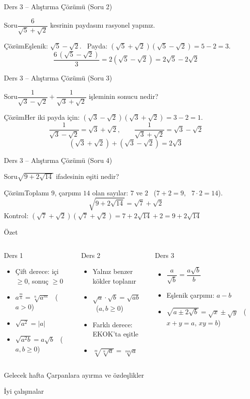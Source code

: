 \documentclass[aspectratio=169,11pt]{beamer}
\newcommand{\soru}[3]{%
\begin{frame}{#1}
  \begin{block}{Soru}\large #2\end{block}
  \pause
  \begin{exampleblock}{Çözüm}\large #3\end{exampleblock}
\end{frame}}
\begin{document}
\soru{Ders 3 -- Alıştırma Çözümü (Soru 2)}
{\(\dfrac{6}{\sqrt5+\sqrt2}\) kesrinin paydasını rasyonel yapınız.}
{Eşlenik: \(\sqrt5-\sqrt2\). \ Payda: \((\sqrt5+\sqrt2)(\sqrt5-\sqrt2)=5-2=3\).
\[\frac{6\,(\sqrt5-\sqrt2)}{3}=2(\sqrt5-\sqrt2)=2\sqrt5-2\sqrt2\]}

\soru{Ders 3 -- Alıştırma Çözümü (Soru 3)}
{\(\dfrac{1}{\sqrt3-\sqrt2}+\dfrac{1}{\sqrt3+\sqrt2}\) işleminin sonucu nedir?}
{Her iki payda için: \((\sqrt3-\sqrt2)(\sqrt3+\sqrt2)=3-2=1\).
\[\frac{1}{\sqrt3-\sqrt2}=\sqrt3+\sqrt2,\qquad \frac{1}{\sqrt3+\sqrt2}=\sqrt3-\sqrt2\]
\[(\sqrt3+\sqrt2)+(\sqrt3-\sqrt2)=2\sqrt3\]}

\soru{Ders 3 -- Alıştırma Çözümü (Soru 4)}
{\(\sqrt{9+2\sqrt{14}}\) ifadesinin eşiti nedir?}
{Toplamı \(9\), çarpımı \(14\) olan sayılar: \(7\) ve \(2\) \ (\(7+2=9\), \ \(7\cdot 2=14\)).
\[\sqrt{9+2\sqrt{14}}=\sqrt7+\sqrt2\]
Kontrol: \((\sqrt7+\sqrt2)(\sqrt7+\sqrt2)=7+2\sqrt{14}+2=9+2\sqrt{14}\) \checkmark}


\begin{frame}{Özet}
\begin{columns}[t]
\begin{block}{Ders 1}
\begin{itemize}
\item Çift derece: içi \(\ge 0\), sonuç \(\ge 0\)
\item \(a^{\frac mn}=\sqrt[n]{a^m}\) \ (\(a>0\))
\item \(\sqrt{a^2}=|a|\)
\item \(\sqrt{a^2b}=a\sqrt b\) \ (\(a,b\ge 0\))
\end{itemize}
\end{block}
\begin{block}{Ders 2}
\begin{itemize}
\item Yalnız benzer kökler toplanır
\item \(\sqrt a\cdot\sqrt b=\sqrt{ab}\) \ (\(a,b\ge 0\))
\item Farklı derece: EKOK'ta eşitle
\item \(\sqrt[m]{\sqrt[n]{a}}=\sqrt[mn]{a}\)
\end{itemize}
\end{block}
\begin{block}{Ders 3}
\begin{itemize}
\item \(\dfrac{a}{\sqrt b}=\dfrac{a\sqrt b}{b}\)
\item Eşlenik çarpımı: \(a-b\)
\item \(\sqrt{a\pm 2\sqrt b}=\sqrt x\pm\sqrt y\) \ (\(x+y=a\), \(xy=b\))
\end{itemize}
\end{block}
\end{columns}
\vspace{6pt}
\begin{alertblock}{Gelecek hafta}
Çarpanlara ayırma ve özdeşlikler
\end{alertblock}
\end{frame}

\begin{frame}
\centering\Large İyi çalışmalar
\end{frame}
\end{document}
